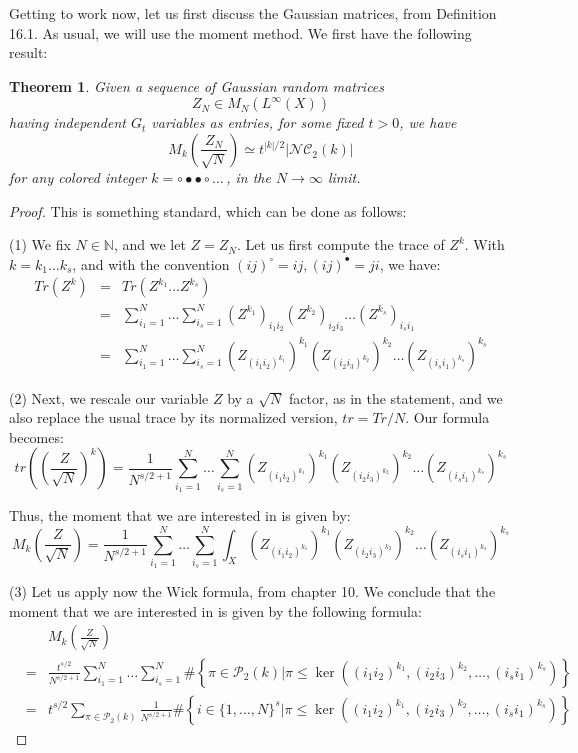 \documentclass[12pt]{amsbook}
\newtheorem{theorem}{Theorem}[chapter]
\begin{document}
\bigskip

Getting to work now, let us first discuss the Gaussian matrices, from Definition 16.1. As usual, we will use the moment method. We first have the following result:

\begin{theorem}
Given a sequence of Gaussian random matrices
$$Z_N\in M_N(L^\infty(X))$$
having independent $G_t$ variables as entries, for some fixed $t>0$, we have
$$M_k\left(\frac{Z_N}{\sqrt{N}}\right)\simeq t^{|k|/2}|\mathcal{NC}_2(k)|$$
for any colored integer $k=\circ\bullet\bullet\circ\ldots\,$, in the $N\to\infty$ limit.
\end{theorem}

\begin{proof}
This is something standard, which can be done as follows:

\medskip

(1) We fix $N\in\mathbb N$, and we let $Z=Z_N$. Let us first compute the trace of $Z^k$. With $k=k_1\ldots k_s$, and with the convention $(ij)^\circ=ij,(ij)^\bullet=ji$, we have:
\begin{eqnarray*}
Tr(Z^k)
&=&Tr(Z^{k_1}\ldots Z^{k_s})\\
&=&\sum_{i_1=1}^N\ldots\sum_{i_s=1}^N(Z^{k_1})_{i_1i_2}(Z^{k_2})_{i_2i_3}\ldots(Z^{k_s})_{i_si_1}\\
&=&\sum_{i_1=1}^N\ldots\sum_{i_s=1}^N(Z_{(i_1i_2)^{k_1}})^{k_1}(Z_{(i_2i_3)^{k_2}})^{k_2}\ldots(Z_{(i_si_1)^{k_s}})^{k_s}
\end{eqnarray*}

(2) Next, we rescale our variable $Z$ by a $\sqrt{N}$ factor, as in the statement, and we also replace the usual trace by its normalized version, $tr=Tr/N$. Our formula becomes:
$$tr\left(\left(\frac{Z}{\sqrt{N}}\right)^k\right)=\frac{1}{N^{s/2+1}}\sum_{i_1=1}^N\ldots\sum_{i_s=1}^N(Z_{(i_1i_2)^{k_1}})^{k_1}(Z_{(i_2i_3)^{k_2}})^{k_2}\ldots(Z_{(i_si_1)^{k_s}})^{k_s}$$

Thus, the moment that we are interested in is given by:
$$M_k\left(\frac{Z}{\sqrt{N}}\right)=\frac{1}{N^{s/2+1}}\sum_{i_1=1}^N\ldots\sum_{i_s=1}^N\int_X(Z_{(i_1i_2)^{k_1}})^{k_1}(Z_{(i_2i_3)^{k_2}})^{k_2}\ldots(Z_{(i_si_1)^{k_s}})^{k_s}$$

(3) Let us apply now the Wick formula, from chapter 10. We conclude that the moment that we are interested in is given by the following formula:
\begin{eqnarray*}
&&M_k\left(\frac{Z}{\sqrt{N}}\right)\\
&=&\frac{t^{s/2}}{N^{s/2+1}}\sum_{i_1=1}^N\ldots\sum_{i_s=1}^N\#\left\{\pi\in\mathcal P_2(k)\Big|\pi\leq\ker\left((i_1i_2)^{k_1},(i_2i_3)^{k_2},\ldots,(i_si_1)^{k_s}\right)\right\}\\
&=&t^{s/2}\sum_{\pi\in\mathcal P_2(k)}\frac{1}{N^{s/2+1}}\#\left\{i\in\{1,\ldots,N\}^s\Big|\pi\leq\ker\left((i_1i_2)^{k_1},(i_2i_3)^{k_2},\ldots,(i_si_1)^{k_s}\right)\right\}
\end{eqnarray*}


\end{proof}
\end{document}
